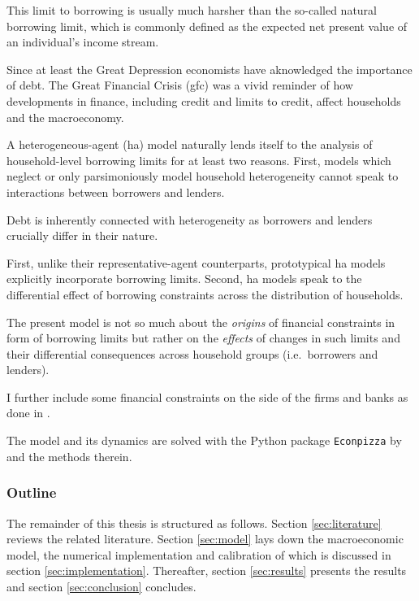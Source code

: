 \documentclass[12pt]{article} %
\numberwithin{equation}{section} %
\begin{document}
This limit to borrowing is usually much harsher than the so-called natural borrowing limit, which is commonly defined as the expected net present value of an individual's income stream. 

Since at least the Great Depression economists have aknowledged the importance of debt. The Great Financial Crisis (\Gls{gfc}) was a vivid reminder of how developments in finance, including credit and limits to credit, affect households and the macroeconomy. 

A heterogeneous-agent (\Gls{ha}) model naturally lends itself to the analysis of household-level borrowing limits for at least two reasons. First, models which neglect or only parsimoniously model household heterogeneity cannot speak to interactions between borrowers and lenders.

Debt is inherently connected with heterogeneity as borrowers and lenders crucially differ in their nature.

First, unlike their representative-agent counterparts, prototypical \Gls{ha} models explicitly incorporate borrowing limits. Second, \Gls{ha} models speak to the differential effect of borrowing constraints across the distribution of households.

The present model is not so much about the \textit{origins} of financial constraints in form of borrowing limits but rather on the \textit{effects} of changes in such limits and their differential consequences across household groups (i.e.~borrowers and lenders).

I further include some financial constraints on the side of the firms and banks as done in \textcite{zoch2022}.

The model and its dynamics are solved with the Python package \texttt{Econpizza} by \textcite{boehl2023econpizza} and the methods therein.

\subsubsection*{Outline}
\label{sec:outline}
The remainder of this thesis is structured as follows. Section \ref{sec:literature} reviews the related literature. Section \ref{sec:model} lays down the macroeconomic model, the numerical implementation and calibration of which is discussed in section \ref{sec:implementation}. Thereafter, section \ref{sec:results} presents the results and section \ref{sec:conclusion} concludes.

\end{document}
